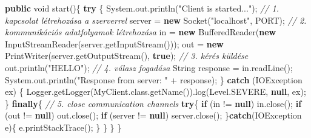 \documentclass[
]{article}
\newenvironment{Shaded}{}{}
\newcommand{\BuiltInTok}[1]{\textcolor[rgb]{0.00,0.50,0.00}{#1}}
\newcommand{\CommentTok}[1]{\textcolor[rgb]{0.38,0.63,0.69}{\textit{#1}}}
\newcommand{\ControlFlowTok}[1]{\textcolor[rgb]{0.00,0.44,0.13}{\textbf{#1}}}
\newcommand{\DataTypeTok}[1]{\textcolor[rgb]{0.56,0.13,0.00}{#1}}
\newcommand{\FunctionTok}[1]{\textcolor[rgb]{0.02,0.16,0.49}{#1}}
\newcommand{\KeywordTok}[1]{\textcolor[rgb]{0.00,0.44,0.13}{\textbf{#1}}}
\newcommand{\NormalTok}[1]{#1}
\newcommand{\OperatorTok}[1]{\textcolor[rgb]{0.40,0.40,0.40}{#1}}
\newcommand{\StringTok}[1]{\textcolor[rgb]{0.25,0.44,0.63}{#1}}
\begin{document}
\begin{Shaded}
\begin{Highlighting}[]
    \KeywordTok{public} \DataTypeTok{void} \FunctionTok{start}\OperatorTok{()\{}
        \ControlFlowTok{try} \OperatorTok{\{}
            \BuiltInTok{System}\OperatorTok{.}\FunctionTok{out}\OperatorTok{.}\FunctionTok{println}\OperatorTok{(}\StringTok{"Client is started..."}\OperatorTok{);}
            \CommentTok{// 1. kapcsolat létrehozása a szerverrel}
\NormalTok{            server }\OperatorTok{=} \KeywordTok{new} \BuiltInTok{Socket}\OperatorTok{(}\StringTok{"localhost"}\OperatorTok{,}\NormalTok{ PORT}\OperatorTok{);}
            \CommentTok{// 2. kommunikációs adatfolyamok létrehozása}
\NormalTok{            in }\OperatorTok{=} \KeywordTok{new} \BuiltInTok{BufferedReader}\OperatorTok{(}\KeywordTok{new} \BuiltInTok{InputStreamReader}\OperatorTok{(}\NormalTok{server}\OperatorTok{.}\FunctionTok{getInputStream}\OperatorTok{()));}
\NormalTok{            out }\OperatorTok{=} \KeywordTok{new} \BuiltInTok{PrintWriter}\OperatorTok{(}\NormalTok{server}\OperatorTok{.}\FunctionTok{getOutputStream}\OperatorTok{(),} \KeywordTok{true}\OperatorTok{);}
            \CommentTok{// 3. kérés küldése}
\NormalTok{            out}\OperatorTok{.}\FunctionTok{println}\OperatorTok{(}\StringTok{"HELLO"}\OperatorTok{);}
            \CommentTok{// 4. válasz fogadása}
            \BuiltInTok{String}\NormalTok{ response }\OperatorTok{=}\NormalTok{ in}\OperatorTok{.}\FunctionTok{readLine}\OperatorTok{();}
            \BuiltInTok{System}\OperatorTok{.}\FunctionTok{out}\OperatorTok{.}\FunctionTok{println}\OperatorTok{(}\StringTok{"Response from server: "} \OperatorTok{+}\NormalTok{ response}\OperatorTok{);}
        \OperatorTok{\}} \ControlFlowTok{catch} \OperatorTok{(}\BuiltInTok{IOException}\NormalTok{ ex}\OperatorTok{)} \OperatorTok{\{}
            \BuiltInTok{Logger}\OperatorTok{.}\FunctionTok{getLogger}\OperatorTok{(}\NormalTok{MyClient}\OperatorTok{.}\FunctionTok{class}\OperatorTok{.}\FunctionTok{getName}\OperatorTok{()).}\FunctionTok{log}\OperatorTok{(}\BuiltInTok{Level}\OperatorTok{.}\FunctionTok{SEVERE}\OperatorTok{,} \KeywordTok{null}\OperatorTok{,}\NormalTok{ ex}\OperatorTok{);}
        \OperatorTok{\}} \ControlFlowTok{finally}\OperatorTok{\{}
            \CommentTok{// 5. close communication channels}
            \ControlFlowTok{try}\OperatorTok{\{}
                \ControlFlowTok{if} \OperatorTok{(}\NormalTok{in }\OperatorTok{!=} \KeywordTok{null}\OperatorTok{)}\NormalTok{ in}\OperatorTok{.}\FunctionTok{close}\OperatorTok{();}
                \ControlFlowTok{if} \OperatorTok{(}\NormalTok{out }\OperatorTok{!=} \KeywordTok{null}\OperatorTok{)}\NormalTok{ out}\OperatorTok{.}\FunctionTok{close}\OperatorTok{();}
                \ControlFlowTok{if} \OperatorTok{(}\NormalTok{server }\OperatorTok{!=} \KeywordTok{null}\OperatorTok{)}\NormalTok{ server}\OperatorTok{.}\FunctionTok{close}\OperatorTok{();}
            \OperatorTok{\}}\ControlFlowTok{catch}\OperatorTok{(}\BuiltInTok{IOException}\NormalTok{ e}\OperatorTok{)\{}
\NormalTok{                e}\OperatorTok{.}\FunctionTok{printStackTrace}\OperatorTok{();}
            \OperatorTok{\}}
        \OperatorTok{\}}
    \OperatorTok{\}}
\OperatorTok{\}}
\end{Highlighting}
\end{Shaded}
\end{document}
